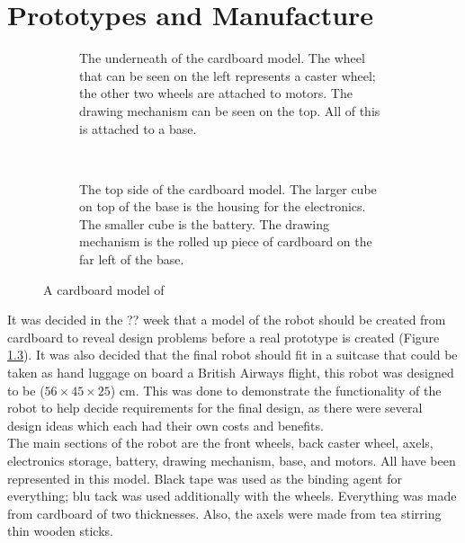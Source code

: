 \chapter{Prototypes and Manufacture}\label{prototypes}\label{section \thechapter}

    \begin{figure}[bh]%
        \centering
        \begin{subfigure}[t]{0.45\textwidth}
            \caption{The underneath of the cardboard model. The wheel that can be seen on the left represents a caster wheel; the other two wheels are attached to motors. The drawing mechanism can be seen on the top. All of this is attached to a base.}
            \label{fig:cardboard model 1}
        \end{subfigure}
        ~
        \begin{subfigure}[t]{0.45\textwidth}
            \caption{The top side of the cardboard model. The larger cube on top of the base is the housing for the electronics. The smaller cube is the battery. The drawing mechanism is the rolled up piece of cardboard on the far left of the base.}
            \label{fig:cardboard model 2}
        \end{subfigure}
        \caption{A cardboard model of \SandE}
        \label{fig:cardboard model}
    \end{figure}
    It was decided in the ?? week that a model of the robot should be created from cardboard to reveal design problems before a real prototype is created (Figure \ref{fig:cardboard model}). It was also decided that the final robot should fit in a suitcase that could be taken as hand luggage on board a British Airways flight, this robot was designed to be ($56 \times 45 \times 25$) cm. This was done to demonstrate the functionality of the robot to help decide requirements for the final design, as there were several design ideas which each had their own costs and benefits.\\
    The main sections of the robot are the front wheels, back caster wheel, axels, electronics storage, battery, drawing mechanism, base, and motors. All have been represented in this model. Black tape was used as the binding agent for everything; blu tack was used additionally with the wheels. Everything was made from cardboard of two thicknesses. Also, the axels were made from tea stirring thin wooden sticks.

